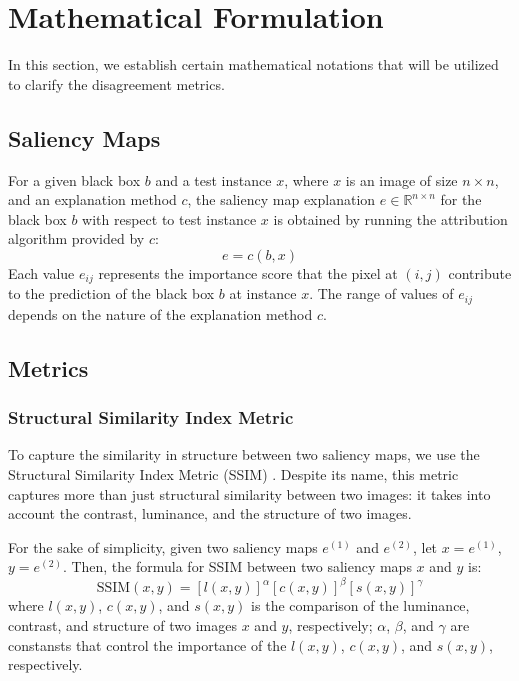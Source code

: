 \section{Mathematical Formulation}
In this section, we establish certain mathematical notations that will be utilized to clarify the disagreement metrics.

\subsection{Saliency Maps}
For a given black box $b$ and a test instance $x$, where $x$ is an image of size $n \times n$, and an explanation method $c$, the saliency map explanation $e \in \mathbb{R}^{n\times n}$ for the black box $b$ with respect to test instance $x$ is obtained by running the attribution algorithm provided by $c$:
\begin{equation}
    e = c(b, x)
\end{equation}
Each value $e_{ij}$ represents the importance score that the pixel at $(i, j)$ contribute to the prediction of the black box $b$ at instance $x$. The range of values of $e_{ij}$ depends on the nature of the explanation method $c$.

\subsection{Metrics}
\label{subsec:metrics}
\subsubsection{Structural Similarity Index Metric}
To capture the similarity in structure between two saliency maps, we use the Structural Similarity Index Metric (SSIM) \cite{ssim}. Despite its name, this metric captures more than just structural similarity between two images: it takes into account the contrast, luminance, and the structure of two images.

For the sake of simplicity, given two saliency maps $e^{(1)}$ and $e^{(2)}$, let $x = e^{(1)}$, $y = e^{(2)}$. Then, the formula for SSIM between two saliency maps $x$ and $y$ is:
\begin{equation}
    \text{SSIM}(x, y) = [l(x, y)]^\alpha [c(x, y)]^\beta [s(x, y)]^\gamma
\end{equation}
where $l(x,y)$, $c(x,y)$, and $s(x,y)$ is the comparison of the luminance, contrast, and structure of two images $x$ and $y$, respectively; $\alpha$, $\beta$, and $\gamma$ are constansts that control the importance of the $l(x,y)$, $c(x,y)$, and $s(x,y)$, respectively.

